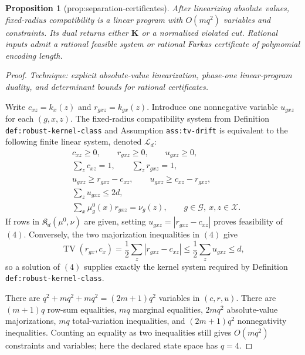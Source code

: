 \documentclass{article}
\newtheorem{proposition}{Proposition}
\begin{document}
\begin{proposition}[prop:separation-certificates]\label{prop:separation-certificates}
After linearizing absolute values, fixed-radius compatibility is a linear program with \(O(mq^2)\) variables and constraints. Its dual returns either \(\mathbf K\) or a normalized violated cut. Rational inputs admit a rational feasible system or rational Farkas certificate of polynomial encoding length.
\end{proposition}
\begin{proof}
\emph{Technique: explicit absolute-value linearization, phase-one linear-program duality, and determinant bounds for rational certificates.}

Write \(c_{xz}=k_x(z)\) and \(r_{gxz}=k_{gx}(z)\).  Introduce one nonnegative variable \(u_{gxz}\) for each \((g,x,z)\).  The fixed-radius compatibility system from Definition \texttt{def:robust-kernel-class} and Assumption \texttt{ass:tv-drift} is equivalent to the following finite linear system, denoted \(\mathcal L_d\):
\[
\begin{aligned}
 &c_{xz}\ge0,\qquad r_{gxz}\ge0,\qquad u_{gxz}\ge0,\\
 &\sum_z c_{xz}=1,\qquad \sum_z r_{gxz}=1,\\
 &u_{gxz}\ge r_{gxz}-c_{xz},\qquad
   u_{gxz}\ge c_{xz}-r_{gxz},\\
 &\sum_z u_{gxz}\le2d,\\
 &\sum_x\mu_g^0(x)r_{gxz}=\nu_g(z),
 \qquad g\in\mathcal G,\ x,z\in\mathcal X.
\end{aligned}
\tag{4}
\]
If rows in \(\mathfrak K_d(\mu^0,\nu)\) are given, setting
\(u_{gxz}=|r_{gxz}-c_{xz}|\) proves feasibility of \((4)\).  Conversely, the two majorization inequalities in \((4)\) give
\[
 \operatorname{TV}(r_{gx},c_x)
 =\frac12\sum_z|r_{gxz}-c_{xz}|
 \le\frac12\sum_z u_{gxz}\le d,
\]
so a solution of \((4)\) supplies exactly the kernel system required by Definition \texttt{def:robust-kernel-class}.

There are \(q^2+mq^2+mq^2=(2m+1)q^2\) variables in \((c,r,u)\).  There are \((m+1)q\) row-sum equalities, \(mq\) marginal equalities, \(2mq^2\) absolute-value majorizations, \(mq\) total-variation inequalities, and \((2m+1)q^2\) nonnegativity inequalities.  Counting an equality as two inequalities still gives \(O(mq^2)\) constraints and variables; here the declared state space has \(q=4\).


\end{proof}
\end{document}
